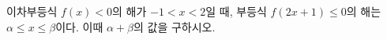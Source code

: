 이차부등식 $f(x)<0$의 해가 $-1<x<2$일 때, 부등식 $f(2x+1)\le 0$의 해는 $\alpha\le x\le \beta$이다. 이때 $\alpha+\beta$의 값을 구하시오.
